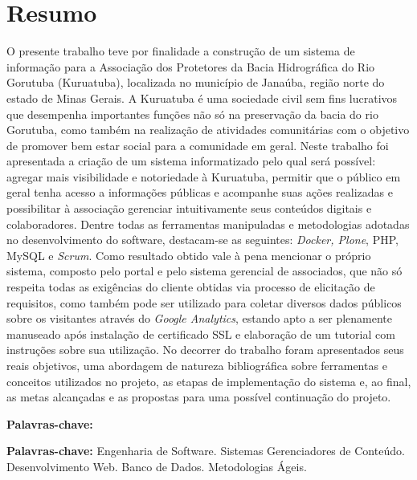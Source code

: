 \chapter*{Resumo}

\vspace{0.4cm}

\noindent O presente trabalho teve por finalidade a construção de um sistema de informação para a Associação dos Protetores da Bacia Hidrográfica do Rio Gorutuba (Kuruatuba), localizada no município de Janaúba, região norte do estado de Minas Gerais. 
A Kuruatuba é uma sociedade civil sem fins lucrativos que desempenha importantes funções não só na preservação da bacia do rio Gorutuba, como também na realização de atividades comunitárias com o objetivo de promover bem estar social para a comunidade em geral. 
Neste trabalho foi apresentada a criação de um sistema informatizado pelo qual será possível: agregar mais visibilidade e notoriedade à Kuruatuba, permitir que o público em geral tenha acesso a informações públicas e acompanhe suas ações realizadas e possibilitar à associação gerenciar intuitivamente seus conteúdos digitais e colaboradores.  
Dentre todas as ferramentas manipuladas e metodologias adotadas no desenvolvimento do software, destacam-se as seguintes: \textit{Docker, Plone}, PHP, MySQL e \textit{Scrum}.
Como resultado obtido vale à pena mencionar o próprio sistema, composto pelo portal e pelo sistema gerencial de associados, que não só respeita todas as exigências do cliente obtidas via processo de elicitação de requisitos, como também pode ser utilizado para coletar diversos dados públicos sobre os visitantes através do \textit{Google Analytics}, estando apto a ser plenamente manuseado após instalação de certificado SSL e elaboração de um tutorial com instruções sobre sua utilização.
No decorrer do trabalho foram apresentados seus reais objetivos, uma abordagem de natureza bibliográfica sobre ferramentas e conceitos utilizados no projeto, as etapas de implementação do sistema e, ao final, as metas alcançadas e as propostas para uma possível continuação do projeto.

\begin{labeling}{\textbf{Palavras-chave:}}
\item[\textbf{Palavras-chave:}] 
Engenharia de Software.
Sistemas Gerenciadores de Conteúdo.
Desenvolvimento Web.
Banco de Dados.
Metodologias Ágeis.
\end{labeling}

